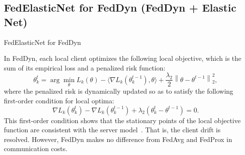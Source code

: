 \documentclass{article} %
\begin{document}
\subsection{FedElasticNet for FedDyn (FedDyn + Elastic Net)} \label{section:feddyn}
\begin{algorithm*}[b!]
    \caption{FedElasticNet for FedDyn}
    \label{algo:feddyn}
    \begin{algorithmic}[1]
    \ENDFORPAR
    \ENDFORPAR
    \EndFor
\end{algorithmic}
\end{algorithm*}
In FedDyn, each local client optimizes the following local objective, which is the sum of its empirical loss and a penalized risk function: 
\begin{equation}\label{eq:feddyn}
    \theta_{k}^{t} = \arg\min_\theta  L_{k}\left ( \theta \right ) - \langle \nabla L_{k} (\theta_k^{t-1}), \theta \rangle + \frac{\lambda_2}{2} \left\| \theta - \theta^{t-1}\right\|^{2}_{2}, 
\end{equation}
where the penalized risk is dynamically updated so as to satisfy the following first-order condition for local optima: 
\begin{equation} \label{eq:feddyn_first}
    \nabla L_k(\theta_k^t) - \nabla L_k(\theta_k^{t-1}) + \lambda_2 (\theta_k^t - \theta^{t-1}) = 0.
\end{equation}
This first-order condition shows that the stationary points of the local objective function are consistent with the server model~\citep{Acar2021federated}. That is, the client drift is resolved. However, FedDyn makes no difference from FedAvg and FedProx in communication costs.%
\end{document}
